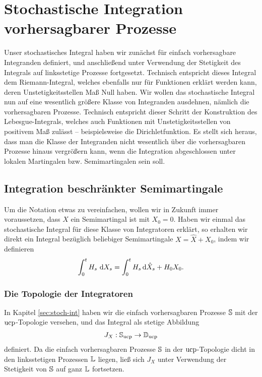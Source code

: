 \chapter{Stochastische Integration vorhersagbarer Prozesse}

Unser stochastisches Integral haben wir zunächst für einfach vorhersagbare
Integranden definiert, und anschließend unter Verwendung der Stetigkeit des
Integrals auf linksstetige Prozesse fortgesetzt. Technisch entspricht dieses
Integral dem Riemann-Integral, welches ebenfalls nur für Funktionen erklärt
werden kann, deren Unstetigkeitsstellen Maß Null haben.
Wir wollen das stochastische Integral nun auf eine wesentlich größere Klasse
von Integranden ausdehnen, nämlich die vorhersagbaren Prozesse. Technisch
entspricht dieser Schritt der Konstruktion des Lebesgue-Integrals, welches auch
Funktionen mit Unstetigkeitsstellen von positivem Maß zulässt -- beispielsweise
die Dirichletfunktion. Es stellt sich heraus, dass man die Klasse der
Integranden nicht wesentlich über die vorhersagbaren Prozesse hinaus vergrößern
kann, wenn die Integration abgeschlossen unter lokalen Martingalen bzw.
Semimartingalen sein soll.

\section{Integration beschränkter Semimartingale}

Um die Notation etwas zu vereinfachen, wollen wir in Zukunft immer voraussetzen,
dass $X$ ein Semimartingal ist mit $X_0 = 0$. Haben wir einmal das stochastische
Integral für diese Klasse von Integratoren erklärt, so erhalten wir direkt ein
Integral bezüglich beliebiger Semimartingale $X=\hat{X}+X_0$, indem wir
definieren
\begin{align*}
\int_0^t H_s \,\dX_s = \int_0^t H_s\,\diffd\hat{X}_s + H_0 X_0.
\end{align*}

\subsection{Die Topologie der Integratoren}

In Kapitel \ref{sec:stoch-int} haben wir die einfach vorhersagbaren Prozesse
$\S$ mit der $\ucp$-Topologie versehen, und das Integral als stetige Abbildung
\begin{align*}
J_X : \S_{\ucp}\to \D_{\ucp}
\end{align*} 
definiert. Da die einfach vorhersagbaren Prozesse $\S$ in der $\ucp$-Topologie
dicht in den linksstetigen Prozessen $\L$ liegen, ließ sich $J_X$ unter
Verwendung der Stetigkeit von $\S$ auf ganz $\L$ fortsetzen.

